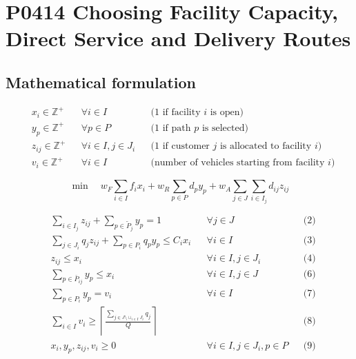 \documentclass[10pt]{article}
\begin{document}
\section*{P0414 Choosing Facility Capacity, Direct Service and Delivery Routes}
\subsection*{Mathematical formulation}
\[
\begin{aligned}
& x_i \in \mathbb{Z}^+ && \forall i \in I && \text{(1 if facility $i$ is open)} \\
& y_p \in \mathbb{Z}^+ && \forall p \in P && \text{(1 if path $p$ is selected)} \\
& z_{ij} \in \mathbb{Z}^+ && \forall i \in I, j \in J_i && \text{(1 if customer $j$ is allocated to facility $i$)} \\
& v_i \in \mathbb{Z}^+ && \forall i \in I && \text{(number of vehicles starting from facility $i$)}
\end{aligned}
\]

\[
\min \quad w_F \sum_{i \in I} f_i x_i + w_R \sum_{p \in P} d_p y_p + w_A \sum_{j \in J} \sum_{i \in I_j} d_{ij} z_{ij}
\]

\[
\begin{aligned}
& \sum_{i \in I_j} z_{ij} + \sum_{p \in \tilde{P}_j} y_p = 1 && \forall j \in J && \text{(2)} \\
& \sum_{j \in J_i} q_j z_{ij} + \sum_{p \in P_i} q_p y_p \le C_i x_i && \forall i \in I && \text{(3)} \\
& z_{ij} \le x_i && \forall i \in I, j \in J_i && \text{(4)} \\
& \sum_{p \in \bar{P}_{ij}} y_p \le x_i && \forall i \in I, j \in J && \text{(6)} \\
& \sum_{p \in P_i} y_p = v_i && \forall i \in I && \text{(7)} \\
& \sum_{i \in I} v_i \ge \left\lceil \frac{\sum_{j \in J \setminus \cup_{i \in I} J_i} q_j}{Q} \right\rceil && && \text{(8)} \\
& x_i, y_p, z_{ij}, v_i \ge 0 && \forall i \in I, j \in J_i, p \in P && \text{(9)}
\end{aligned}
\]
\end{document}

